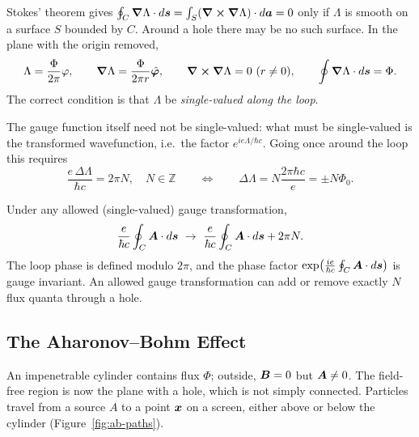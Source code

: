\begin{fact}
Stokes' theorem gives $\oint_C\grad\Lambda\cdot d\bm{s} = \int_S(\curl\grad\Lambda)\cdot d\bm{a} = 0$ only if $\Lambda$ is smooth on a surface $S$ bounded by $C$. Around a hole there may be no such surface. In the plane with the origin removed,
\[
    \Lambda = \frac{\Phi}{2\pi}\varphi,
    \qquad
    \grad\Lambda = \frac{\Phi}{2\pi r}\hat{\bm{\varphi}},
    \qquad
    \curl\grad\Lambda = 0\ (r\neq0),
    \qquad
    \oint\grad\Lambda\cdot d\bm{s} = \Phi .
\]
The correct condition is that $\Lambda$ be \emph{single-valued along the loop}.
\end{fact}

The gauge function itself need not be single-valued: what must be single-valued is the transformed wavefunction, i.e.\ the factor $e^{ie\Lambda/\hbar c}$. Going once around the loop this requires
\[
    \frac{e\,\Delta\Lambda}{\hbar c} = 2\pi N,
    \quad
    N\in\mathbb{Z}
    \qquad\Longleftrightarrow\qquad
    \Delta\Lambda = N\frac{2\pi\hbar c}{e} = \pm N\Phi_0 .
\]

\begin{theorem}
Under any allowed (single-valued) gauge transformation,
\[
    \frac{e}{\hbar c}\oint_C\vect{A}\cdot d\lvect{s}\ \to\ \frac{e}{\hbar c}\oint_C\vect{A}\cdot d\lvect{s} + 2\pi N .
\]
The loop phase is defined modulo $2\pi$, and the phase factor $\exp\bigl(\frac{ie}{\hbar c}\oint_C\vect{A}\cdot d\lvect{s}\bigr)$ is gauge invariant. An allowed gauge transformation can add or remove exactly $N$ flux quanta through a hole.
\end{theorem}

\subsection{The Aharonov--Bohm Effect}

An impenetrable cylinder contains flux $\Phi$; outside, $\vect{B} = 0$ but $\vect{A}\neq0$. The field-free region is now the plane with a hole, which is not simply connected. Particles travel from a source $A$ to a point $\bm{x}$ on a screen, either above or below the cylinder (Figure~\ref{fig:ab-paths}).


